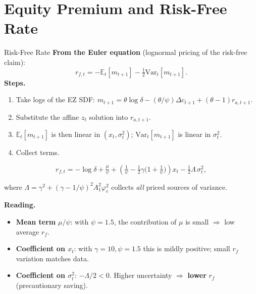 \documentclass{beamer}
\newcommand{\E}{\mathbb{E}}
\newcommand{\Var}{\mathrm{Var}}
\begin{document}
\section{Equity Premium and Risk-Free Rate}

\begin{frame}{Risk-Free Rate}
    \textbf{From the Euler equation} (lognormal pricing of the risk-free claim):
    \begin{equation*}
        r_{f,t} = -\E_t[m_{t+1}] - \tfrac{1}{2}\Var_t[m_{t+1}].
    \end{equation*}
    \textbf{Steps.}
    \begin{enumerate}
    	\item Take logs of the EZ SDF: $m_{t+1} = \theta\log\delta - (\theta/\psi)\Delta c_{t+1} + (\theta-1)r_{a,t+1}$.
    	\item Substitute the affine $z_t$ solution into $r_{a,t+1}$.
    	\item $\E_t[m_{t+1}]$ is then linear in $(x_t,\sigma_t^2)$; $\Var_t[m_{t+1}]$ is linear in $\sigma_t^2$.
    	\item Collect terms.
    \end{enumerate}
    \begin{tcolorbox}[colback=blue!5!white, colframe=blue!75!black, title=Risk-Free Rate]
    \begin{equation}
        r_{f,t} = -\log\delta + \tfrac{\mu}{\psi} + \left(\tfrac{1}{\psi} - \tfrac{1}{2}\gamma\bigl(1+\tfrac{1}{\psi}\bigr)\right)x_t - \tfrac{1}{2}\Lambda\,\sigma_t^2,
    \end{equation}
    \end{tcolorbox}
    where $\Lambda = \gamma^2 + (\gamma-1/\psi)^2 A_1^2 \varphi_e^2$ collects \textit{all} priced sources of variance.

    \textbf{Reading.}
    \begin{itemize}
        \item \textbf{Mean term} $\mu/\psi$: with $\psi=1.5$, the contribution of $\mu$ is small $\Rightarrow$ low average $r_f$.
        \item \textbf{Coefficient on $x_t$}: with $\gamma = 10, \psi = 1.5$ this is mildly positive; small $r_f$ variation matches data.
        \item \textbf{Coefficient on $\sigma_t^2$}: $-\Lambda/2 < 0$. Higher uncertainty $\Rightarrow$ \textbf{lower} $r_f$ (precautionary saving).
    \end{itemize}
\end{frame}
\end{document}
